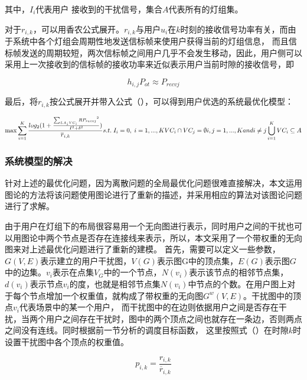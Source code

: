 其中，$I_{i}$代表用户 接收到的干扰信号，集合$A$代表所有的灯组集。

对于$r_{i,k}$，可以用香农公式展开。$r_{i,k}$与用户$u_{i}$在$k$时刻的接收信号功率有关，而由于系统中各个灯组会周期性地发送信标帧来使用户获得当前的灯组信息，
而且信标帧发送的周期较短，两次信标帧之间用户几乎不会发生移动，因此，用户侧可以采用上一次接收到的信标帧的接收功率来近似表示用户当前时隙的接收信号，即

\begin{equation}
    {h_{i,j}}{P_{ot}} \approx {P_{recvj}}
\end{equation}

最后，将$r_{i,k}$按公式展开并带入公式（），可以得到用户优选的系统最优化模型：

\begin{equation}
    \max \sum_{i=1}^{K}\frac{log_{2}(1+\frac{{\sum_{LA_{j} VC_{i}}RP_{recvj}}^2}{I^2+\delta^2})}{\overline{r}_{i,k}} \\
    s.t.\; I_{i} = 0,\; i=1,...,K \\
        VC_{i} \cap VC_{j} = \emptyset  i,j= 1,...,K and i \ne j  \\
        \bigcup_{i = 1}^K V{C_i} \subseteq A
\end{equation}

\subsubsection{系统模型的解决}
针对上述的最优化问题，因为离散问题的全局最优化问题很难直接解决，本文运用图论的方法将该问题使用图论进行了重新的描述，并采用相应的算法对该图论问题进行了求解。

由于用户在灯组下的布局很容易用一个无向图进行表示，同时用户之间的干扰也可以用图论中两个节点是否存在连接线来表示，所以，本文采用了一个带权重的无向图来对上述最优化问题进行了重新的建模。
首先，需要可以定义一些参数，$G(V,E)$表示建立的用户干扰图，$V(G)$表示图G中的顶点集，$E(G)$表示图$G$中的边集。$v_{i}$表示在点集$V_{G}$中的一个节点，$N(v_{i})$表示该节点的相邻节点集，
$d(v_{i})$表示节点$v_{i}$的度，也就是相邻节点集$N(v_{i})$中节点的个数。在用户图上对于每个节点增加一个权重值，就构成了带权重的无向图$G^{w}(V,E)$。干扰图中的顶点$v_{i}$代表场景中的某一个用户，
而干扰图中的在边则依据用户之间是否存在干扰，当两个用户之间存在干扰时，图中的两个顶点之间也就存在一条边，否则两点之间没有连线。同时根据前一节分析的调度目标函数，
这里按照式（）在时隙$k$时设置干扰图中各个顶点的权重值。

\begin{equation}
    {p_{i,k}} = \frac{{{r_{i,k}}}}{{\overline {r}_{i,k} }}
\end{equation}


